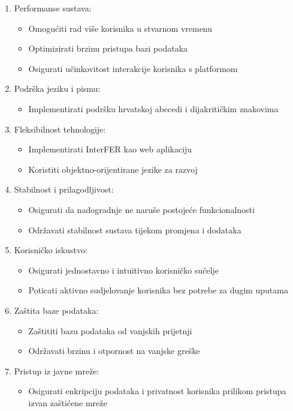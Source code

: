 \begin{enumerate}

    \item Performanse sustava:
        \begin{itemize}
            \item Omogućiti rad više korisnika u stvarnom vremenu
            \item Optimizirati brzinu pristupa bazi podataka
            \item Osigurati učinkovitost interakcije korisnika s platformom
        \end{itemize}

    \item Podrška jeziku i pismu:
        \begin{itemize}
            \item Implementirati podršku hrvatskoj abecedi i dijakritičkim znakovima
        \end{itemize}

    \item Fleksibilnost tehnologije:
        \begin{itemize}
            \item Implementirati InterFER kao web aplikaciju
            \item Koristiti objektno-orijentirane jezike za razvoj
        \end{itemize}

    \item Stabilnost i prilagodljivost:
        \begin{itemize}
            \item Osigurati da nadogradnje ne naruše postojeće funkcionalnosti
            \item Održavati stabilnost sustava tijekom promjena i dodataka
        \end{itemize}

    \item Korisničko iskustvo:
        \begin{itemize}
            \item Osigurati jednostavno i intuitivno korisničko sučelje
            \item Poticati aktivno sudjelovanje korisnika bez potrebe za dugim uputama
        \end{itemize}

    \item Zaštita baze podataka:
        \begin{itemize}
            \item Zaštititi bazu podataka od vanjskih prijetnji
            \item Održavati brzinu i otpornost na vanjske greške
        \end{itemize}

    \item Pristup iz javne mreže:
        \begin{itemize}
            \item Osigurati enkripciju podataka i privatnost korisnika prilikom pristupa izvan zaštićene mreže
        \end{itemize}

\end{enumerate}



